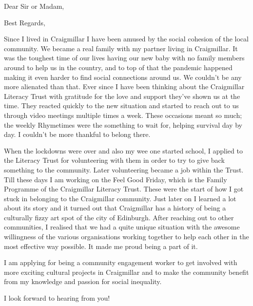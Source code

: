 \documentclass[10pt,a4paper,roman]{moderncv}
\begin{document}
\clearpage

\date{July 1, 2025}
\opening{Dear Sir or Madam,}
\closing{Best Regards,}
\makelettertitle

Since I lived in Craigmillar I have been amused by the social cohesion of the local community. We became a real family with my partner living in Craigmillar. It was the toughest time of our lives having our new baby with no family members around to help us in the country, and to top of that the pandemic happened making it even harder to find social connections around us. We couldn't be any more alienated than that. Ever since I have been thinking about the Craigmillar Literacy Trust with gratitude for the love and support they've shown us at the time. They reacted quickly to the new situation and started to reach out to us through video meetings multiple times a week. These occasions meant so much; the weekly Rhymetimes were the something to wait for, helping survival day by day. I couldn't be more thankful to belong there.

When the lockdowns were over and also my wee one started school, I applied to the Literacy Trust for volunteering with them in order to try to give back something to the community. Later volunteering became a job within the Trust. Till these days I am working on the Feel Good Friday, which is the Family Programme of the Craigmillar Literacy Trust. These were the start of how I got stuck in belonging to the Craigmillar community. Just later on I learned a lot about its story and it turned out that Craigmillar has a history of being a culturally fizzy art spot of the city of Edinburgh. After reaching out to other communities, I realised that we had a quite unique situation with the awesome willingness of the various organisations working together to help each other in the most effective way possible. It made me proud being a part of it.

I am applying for being a community engagement worker to get involved with more exciting cultural projects in Craigmillar and to make the community benefit from my knowledge and passion for social inequality.

I look forward to hearing from you!

\makeletterclosing
\end{document}
